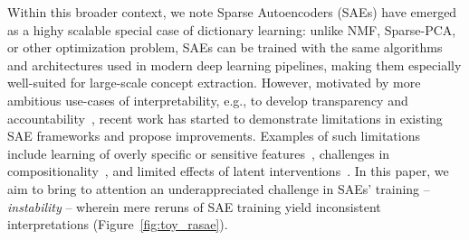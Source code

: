 Within this broader context, we note Sparse Autoencoders (SAEs) have emerged as a highy scalable special case of dictionary learning: unlike NMF, Sparse-PCA, or other optimization problem, SAEs can be trained with the same algorithms and architectures used in modern deep learning pipelines, making them especially well-suited for large-scale concept extraction. 
However, motivated by more ambitious use-cases of interpretability, e.g., to develop transparency and accountability~\cite{anwar2024foundational}, recent work has started to demonstrate limitations in existing SAE frameworks and propose improvements. Examples of such limitations include learning of overly specific or sensitive features~\cite{bricken2023monosemanticity, chanin2024absorption}, challenges in compositionality~\cite{wattenberg2024relational, lwcomposition}, and limited effects of latent interventions~\cite{bhalla2024towards, menon2024analyzing}.
In this paper, we aim to bring to attention an underappreciated challenge in SAEs' training --\textit{instability} -- wherein mere reruns of SAE training yield inconsistent interpretations (Figure~\ref{fig:toy_rasae}).